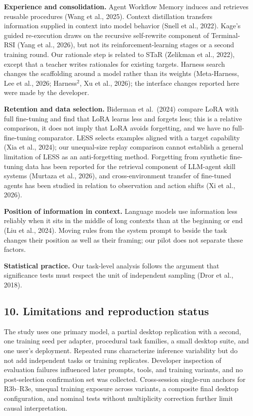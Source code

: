 \documentclass[
  10pt,
]{article}
\begin{document}
\textbf{Experience and consolidation.} Agent Workflow Memory induces and
retrieves reusable procedures (Wang et al., 2025). Context distillation
transfers information supplied in context into model behavior (Snell et
al., 2022). Kage's guided re-execution draws on the recursive
self-rewrite component of Terminal-RSI (Yang et al., 2026), but not its
reinforcement-learning stages or a second training round. Our rationale
step is related to STaR (Zelikman et al., 2022), except that a teacher
writes rationales for existing targets. Harness search changes the
scaffolding around a model rather than its weights (Meta-Harness, Lee et
al., 2026; Harness\(^2\), Xu et al., 2026); the interface changes
reported here were made by the developer.

\textbf{Retention and data selection.} Biderman et al.~(2024) compare
LoRA with full fine-tuning and find that LoRA learns less and forgets
less; this is a relative comparison, it does not imply that LoRA avoids
forgetting, and we have no full-fine-tuning comparator. LESS selects
examples aligned with a target capability (Xia et al., 2024); our
unequal-size replay comparison cannot establish a general limitation of
LESS as an anti-forgetting method. Forgetting from synthetic fine-tuning
data has been reported for the retrieval component of LLM-agent skill
systems (Murtaza et al., 2026), and cross-environment transfer of
fine-tuned agents has been studied in relation to observation and action
shifts (Xi et al., 2026).

\textbf{Position of information in context.} Language models use
information less reliably when it sits in the middle of long contexts
than at the beginning or end (Liu et al., 2024). Moving rules from the
system prompt to beside the task changes their position as well as their
framing; our pilot does not separate these factors.

\textbf{Statistical practice.} Our task-level analysis follows the
argument that significance tests must respect the unit of independent
sampling (Dror et al., 2018).

\subsection{10. Limitations and reproduction
status}\label{limitations-and-reproduction-status}

The study uses one primary model, a partial desktop replication with a
second, one training seed per adapter, procedural task families, a small
desktop suite, and one user's deployment. Repeated runs characterize
inference variability but do not add independent tasks or training
replicates. Developer inspection of evaluation failures influenced later
prompts, tools, and training variants, and no post-selection
confirmation set was collected. Cross-session single-run anchors for
R3b--R3e, unequal training exposure across variants, a composite final
desktop configuration, and nominal tests without multiplicity correction
further limit causal interpretation.
\end{document}
